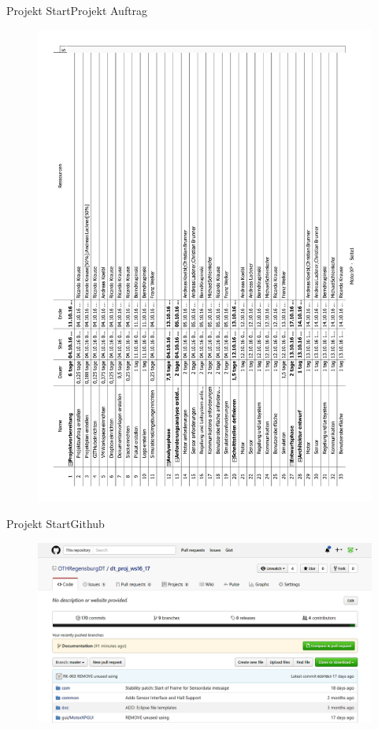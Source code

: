  \begin{frame}{Projekt Start}{Projekt Auftrag}
\begin{figure} [htbp]
 \centering
 \includegraphics[scale=0.3,angle=270]{../projectdefinition/Appendix/DT_Projektplan_Gr3_MotorXP_2.pdf}
\end{figure}
 \end{frame}
  \begin{frame}{Projekt Start}{Github}
\begin{figure} [htbp]
 \centering
 \includegraphics[scale=0.3]{../projectdefinition/Bilder/Github.png}
\end{figure}
 \end{frame}
